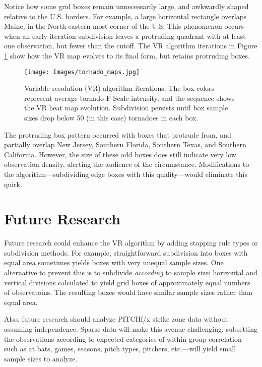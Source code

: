 Notice how some grid boxes remain unnecessarily large, and awkwardly shaped relative to the U.S. borders. For example, a large horizontal rectangle overlaps Maine, in the North-eastern most corner of the U.S. This phenomenon occurs when an early iteration subdivision leaves a protruding quadrant with at least one observation, but fewer than the cutoff. The VR algorithm iterations in Figure \ref{fig:tornado2} show how the VR map evolves to its final form, but retains protruding boxes.
        \begin{figure}[H]
      	\centering      
      	\texttt{[image: Images/tornado\_maps.jpg]}
      	\caption{Variable-resolution (VR) algorithm iterations. The box colors represent average tornado F-Scale intensity, and the sequence shows the VR heat map evolution. Subdivision persists until box sample sizes drop below 50 (in this case) tornadoes in each box.}
      	\label{fig:tornado2}
        \end{figure}
The protruding box pattern occurred with boxes that protrude from, and partially overlap New Jersey, Southern Florida, Southern Texas, and Southern California. However, the size of these odd boxes does still indicate very low observation density, alerting the audience of the circumstance. Modifications to the algorithm---subdividing edge boxes with this quality---would eliminate this quirk.

\section{Future Research} \label{fr}

Future research could enhance the VR algorithm by adding stopping rule types or subdivision methods. For example, straightforward subdivision into boxes with equal area sometimes yields boxes with very unequal sample sizes. One alternative to prevent this is to subdivide {\it according} to sample size; horizontal and vertical divisions calculated to yield grid boxes of approximately equal numbers of observatoins. The resulting boxes would have similar sample sizes rather than equal area.

Also, future research should analyze PITCHf/x\textsuperscript{\textregistered} strike zone data without assuming independence. Sparse data will make this avenue challenging; subsetting the observations according to expected categories of within-group correlation---such as at bats, games, seasons, pitch types, pitchers, etc.---will yield small sample sizes to analyze.

